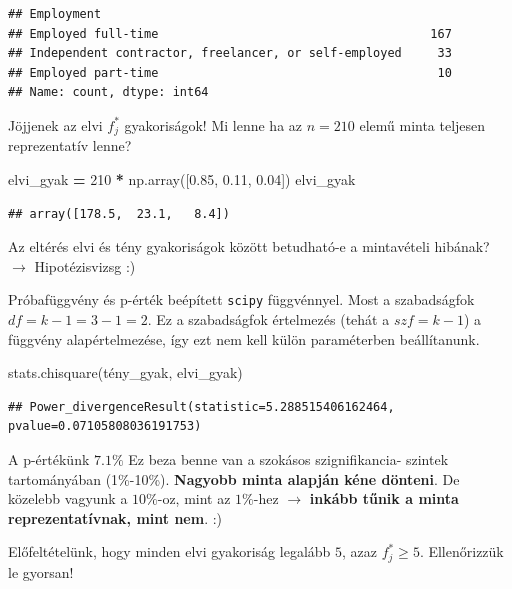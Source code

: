 \documentclass[
]{book}
\newenvironment{Shaded}{\begin{snugshade}}{\end{snugshade}}
\newcommand{\DecValTok}[1]{\textcolor[rgb]{0.00,0.00,0.81}{#1}}
\newcommand{\FloatTok}[1]{\textcolor[rgb]{0.00,0.00,0.81}{#1}}
\newcommand{\NormalTok}[1]{#1}
\newcommand{\OperatorTok}[1]{\textcolor[rgb]{0.81,0.36,0.00}{\textbf{#1}}}
\begin{document}
\begin{verbatim}
## Employment
## Employed full-time                                      167
## Independent contractor, freelancer, or self-employed     33
## Employed part-time                                       10
## Name: count, dtype: int64
\end{verbatim}

Jöjjenek az elvi \(f^*_j\) gyakoriságok! Mi lenne ha az \(n=210\) elemű minta teljesen reprezentatív lenne?

\begin{Shaded}
\begin{Highlighting}[]
\NormalTok{elvi\_gyak }\OperatorTok{=} \DecValTok{210} \OperatorTok{*}\NormalTok{ np.array([}\FloatTok{0.85}\NormalTok{, }\FloatTok{0.11}\NormalTok{, }\FloatTok{0.04}\NormalTok{])}
\NormalTok{elvi\_gyak}
\end{Highlighting}
\end{Shaded}

\begin{verbatim}
## array([178.5,  23.1,   8.4])
\end{verbatim}

Az eltérés elvi és tény gyakoriságok között betudható-e a mintavételi hibának? \(\rightarrow\) Hipotézisvizsg :)

Próbafüggvény és p-érték beépített \texttt{scipy} függvénnyel. Most a szabadságfok \(df=k-1=3-1=2\). Ez a szabadságfok értelmezés (tehát a \(szf=k-1\)) a függvény alapértelmezése, így ezt nem kell külön paraméterben beállítanunk.

\begin{Shaded}
\begin{Highlighting}[]
\NormalTok{stats.chisquare(tény\_gyak, elvi\_gyak)}
\end{Highlighting}
\end{Shaded}

\begin{verbatim}
## Power_divergenceResult(statistic=5.288515406162464, pvalue=0.07105808036191753)
\end{verbatim}

A p-értékünk \(7.1\%\) Ez beza benne van a szokásos szignifikancia- szintek tartományában (1\%-10\%). \textbf{Nagyobb minta alapján kéne dönteni}. De közelebb vagyunk a \(10\%\)-oz, mint az \(1\%\)-hez \(\rightarrow\) \textbf{inkább tűnik a minta reprezentatívnak, mint nem}. :)

Előfeltételünk, hogy minden elvi gyakoriság legalább \(5\), azaz \(f^*_j \geq 5\). Ellenőrizzük le gyorsan!
\end{document}
